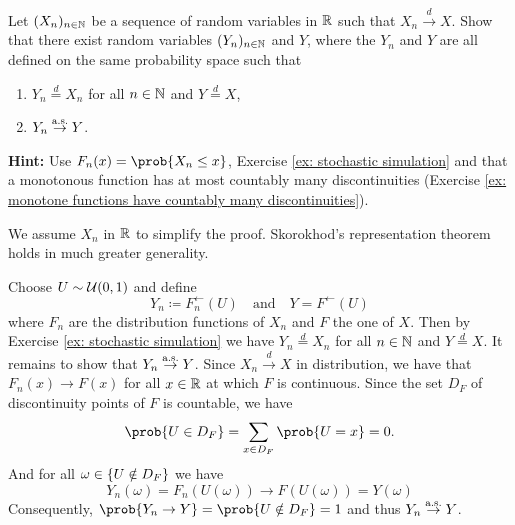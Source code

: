 \begin{exercise}[subtitle={Skorokhod's representation theorem \Coffeecup\Coffeecup}]
    \label{ex: skorokhod representation}
    Let \((X_n)_{n \in \mathbb{N}}\) be a sequence of random variables in \(\mathbb{R}\)
    such that \(X_n \xrightarrow{d} X\). Show that there exist random variables
    \((Y_n)_{n\in \mathbb{N}}\) and \(Y\), where the \(Y_n\) and \(Y\) are all defined on the
    same probability space such that
    \begin{enumerate}[label=(\roman*), noitemsep]
        \item \(Y_n \overset{d}= X_n\) for all \(n\in \mathbb{N}\) and \(Y \overset{d}= X\),
        \item \(Y_n \overset{\operatorname{\text{a.s.}}}\to Y\).
    \end{enumerate}
    \textbf{Hint:} Use \(F_n(x) = \prob{X_n \le x}\), Exercise \ref{ex:
    stochastic simulation} and that a monotonous function has at most countably
    many discontinuities (Exercise \ref{ex: monotone functions have countably
    many discontinuities}).
    \begin{remark}
        We assume \(X_n\) in \(\mathbb{R}\) to simplify the proof. Skorokhod's representation 
        theorem holds in much greater generality.
    \end{remark}
\end{exercise}
\begin{solution}
    Choose \(U\sim \mathcal{U}(0,1)\) and define
    \[
        Y_n \coloneq F_n^{\leftarrow}(U)
        \quad \text{and}\quad
        Y = F^{\leftarrow}(U)
    \] where \(F_n\) are the distribution functions of \(X_n\) and \(F\) the
    one of \(X\). Then by Exercise \ref{ex: stochastic simulation} we have
    \(Y_n \overset{d}= X_n\) for all \(n\in \mathbb{N}\) and
    \(Y \overset{d}= X\).  It remains to show that \(Y_n \overset{\operatorname{\text{a.s.}}}\to
    Y\). Since \(X_n \overset{d}\to X\) in distribution, we have that
    \(F_n(x) \to F(x)\) for all \(x\in \mathbb{R}\) at which \(F\) is continuous.
    Since the set \(D_F\) of discontinuity points of \(F\) is countable, we have
    \[
        \prob{U \in D_F} = \sum_{x\in D_F}\prob{U = x} = 0.
    \]
    And for all \(\omega \in \{U \notin D_F\}\) we have
    \[
        Y_n(\omega) = F_n(U(\omega)) \to F(U(\omega))=Y(\omega)
    \]
    Consequently, \(\prob{ Y_n \to Y } = \prob{U \notin D_F} = 1\) and thus \(Y_n \overset{\operatorname{\text{a.s.}}}\to Y\).
\end{solution}
